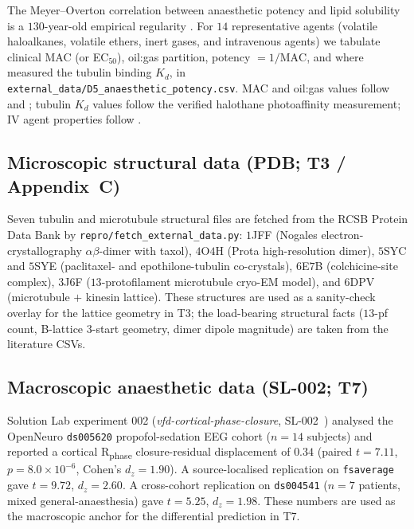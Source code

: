 \documentclass[11pt,a4paper]{article}
\begin{document}
The Meyer--Overton correlation between anaesthetic potency and lipid
solubility is a $130$-year-old empirical regularity
\cite{FranksLieb1994}. For $14$ representative agents
(volatile haloalkanes, volatile ethers, inert gases, and intravenous
agents) we tabulate clinical MAC (or EC$_{50}$), oil:gas partition,
potency $= 1/\mathrm{MAC}$, and where measured the tubulin binding
$K_d$, in \texttt{external\_data/D5\_anaesthetic\_potency.csv}. MAC and
oil:gas values follow \citet{Eger2001} and \citet{FranksLieb1994};
tubulin $K_d$ values follow the verified \citet{Eckenhoff1993} halothane
photoaffinity measurement; IV agent properties follow
\citet{Hemmings2005}.

\subsection{Microscopic structural data (PDB; T3 / Appendix~C)}

Seven tubulin and microtubule structural files are fetched from the
RCSB Protein Data Bank by \texttt{repro/fetch\_external\_data.py}: $1$JFF
(Nogales electron-crystallography $\alpha\beta$-dimer with taxol),
$4$O$4$H (Prota high-resolution dimer), $5$SYC and $5$SYE (paclitaxel-
and epothilone-tubulin co-crystals), $6$E$7$B (colchicine-site complex),
$3$J$6$F ($13$-protofilament microtubule cryo-EM model), and $6$DPV
(microtubule $+$ kinesin lattice). These structures are used as a
sanity-check overlay for the lattice geometry in \textsf{T3}; the
load-bearing structural facts ($13$-pf count, B-lattice $3$-start
geometry, dimer dipole magnitude) are taken from the literature CSVs.

\subsection{Macroscopic anaesthetic data (SL-002; \textsf{T7})}

Solution Lab experiment 002 (\emph{vfd-cortical-phase-closure},
SL-002~\cite{SmartCorticalPhaseClosure}) analysed the OpenNeuro
\texttt{ds005620} propofol-sedation EEG cohort ($n=14$ subjects) and
reported a cortical R\textsubscript{phase} closure-residual displacement
of $0.34$ (paired $t = 7.11$, $p = 8.0\times 10^{-6}$, Cohen's $d_z =
1.90$). A source-localised replication on \texttt{fsaverage} gave
$t = 9.72$, $d_z = 2.60$. A cross-cohort replication on
\texttt{ds004541} ($n=7$ patients, mixed general-anaesthesia) gave
$t = 5.25$, $d_z = 1.98$. These numbers are used as the macroscopic
anchor for the differential prediction in \textsf{T7}.
\end{document}
